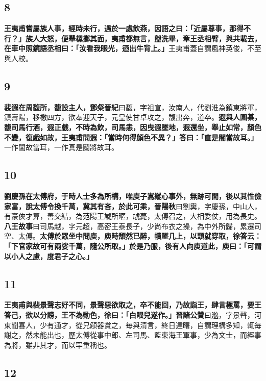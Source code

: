 \subsection*{8}

\textbf{王夷甫嘗屬族人事，經時未行，遇於一處飲燕，因語之曰：「近屬尊事，那得不行？」族人大怒，便舉樏擲其面，夷甫都無言，盥洗畢，牽王丞相臂，與共載去，在車中照鏡語丞相曰：「汝看我眼光，迺出牛背上。」}{\footnotesize 王夷甫蓋自謂風神英俊，不至與人校。}

\subsection*{9}

\textbf{裴遐在周馥所，馥設主人，}{\footnotesize \textbf{鄧粲晉紀}曰馥，字祖宣，汝南人，代劉淮為鎮東將軍，鎮壽陽，移檄四方，欲奉迎天子，元皇使甘卓攻之，馥出奔，道卒。}\textbf{遐與人圍棊，馥司馬行酒，遐正戲，不時為飲，司馬恚，因曳遐墜地，遐還坐，舉止如常，顏色不變，復戲如故，王夷甫問遐：「當時何得顏色不異？」答曰：「直是闇當故耳。」}{\footnotesize 一作闇故當耳，一作真是鬬將故耳。}

\subsection*{10}

\textbf{劉慶孫在太傅府，于時人士多為所構，唯庾子嵩縱心事外，無跡可間，後以其性儉家富，說太傅令換千萬，冀其有吝，於此可乘，}{\footnotesize \textbf{晉陽秋}曰劉輿，字慶孫，中山人，有豪俠才算，善交結，為范陽王虓所暱，虓薨，太傅召之，大相委仗，用為長史。\textbf{八王故事}曰司馬越，字元超，高密王泰長子，少尚布衣之操，為中外所歸，累遷司空、太傅。}\textbf{太傅於眾坐中問庾，庾時頽然已醉，幘墜几上，以頭就穿取，徐答云：「下官家故可有兩娑千萬，隨公所取。」於是乃服，後有人向庾道此，庾曰：「可謂以小人之慮，度君子之心。」}

\subsection*{11}

\textbf{王夷甫與裴景聲志好不同，景聲惡欲取之，卒不能回，乃故詣王，肆言極罵，要王答己，欲以分謗，王不為動色，徐曰：「白眼兒遂作。」}{\footnotesize \textbf{晉諸公贊}曰邈，字景聲，河東聞喜人，少有通才，從兄頠器賞之，毎與清言，終日達曙，自謂理構多知，輒毎謝之，然未能出也，歷太傅從事中郎、左司馬、監東海王軍事，少為文士，而經事為將，雖非其才，而以罕重稱也。}

\subsection*{12}

